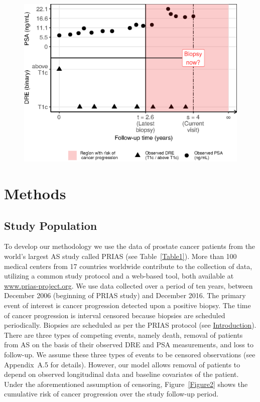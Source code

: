 \documentclass[Afour,sagev,times]{sagej}
\begin{document}
\begin{figure}[!htb]
\captionsetup{justification=justified}
\centerline{\includegraphics[width=\columnwidth]{Figure1.eps}}

\label{Figure1}
\end{figure}

\section{Methods}
\label{sec:methods}
\subsection{Study Population}
\label{subsec:study_population}
To develop our methodology we use the data of prostate cancer patients from the world's largest AS study called PRIAS \cite{bokhorst2016decade} (see Table~\ref{Table1}). More than 100 medical centers from 17 countries worldwide contribute to the collection of data, utilizing a common study protocol and a web-based tool, both available at \url{www.prias-project.org}. We use data collected over a period of ten years, between December 2006 (beginning of PRIAS study) and December 2016. The primary event of interest is cancer progression detected upon a positive biopsy. The time of cancer progression is interval censored because biopsies are scheduled periodically. Biopsies are scheduled as per the PRIAS protocol (see \hyperref[sec:introduction]{Introduction}). There are three types of competing events, namely death, removal of patients from AS on the basis of their observed DRE and PSA measurements, and loss to follow-up. We assume these three types of events to be censored observations (see Appendix~A.5 for details). However, our model allows removal of patients to depend on observed longitudinal data and baseline covariates of the patient. Under the aforementioned assumption of censoring, Figure~\ref{Figure2} shows the cumulative risk of cancer progression over the study follow-up period.
\end{document}
